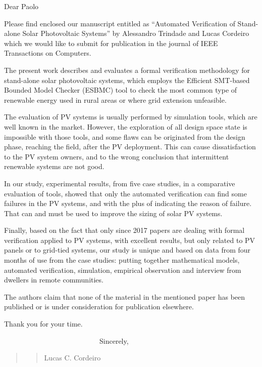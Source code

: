 \documentclass[11pt]{article}
\newcommand\vi{\vspace{\baselineskip}}
\begin{document}
\indent Dear Paolo
\vi

Please find enclosed our manuscript entitled as ``Automated Verification of Stand-alone Solar Photovoltaic Systems'' by Alessandro Trindade and Lucas Cordeiro which we would like to submit for publication in the journal of IEEE Transactions on Computers.

The present work describes and evaluates a formal verification methodology for stand-alone solar photovoltaic systems, which employs the Efficient SMT-based Bounded Model Checker (ESBMC) tool to check the most common type of renewable energy used in rural areas or where grid extension unfeasible.

The evaluation of PV systems is usually performed by simulation tools, which are well known in the market. However, the exploration of all design space state is impossible with those tools, and some flaws can be originated from the design phase, reaching the field, after the PV deployment. This can cause dissatisfaction to the PV system owners, and to the wrong conclusion that intermittent renewable systems are not good.
   
In our study, experimental results, from five case studies, in a comparative evaluation of tools, showed that only the automated verification can find some failures in the PV systems, and with the plus of indicating the reason of failure. That can and must be used to improve the sizing of solar PV systems.

Finally, based on the fact that only since 2017 papers are dealing with formal verification applied to PV systems, with excellent results, but only related to PV panels or to grid-tied systems, our study is unique and based on data from four months of use from the case studies: putting together mathematical models, automated verification, simulation, empirical observation and interview from dwellers in remote communities.

The  authors  claim  that  none  of  the  material  in  the mentioned  paper  has  been  published  or  is  under  consideration for publication elsewhere.

\vi

Thank you for your time.
\vi

\indent
~~~~~~~~~~~~~~~~~~~~~~~~~~~Sincerely,\\

\begin{quote}
\begin{quote}
\begin{flushright}



Lucas C. Cordeiro~~~~~~~
\end{flushright}
\end{quote}
\end{quote}


 
 
\end{document}
